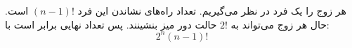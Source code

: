 \p   
هر زوج را یک فرد در نظر می‌گیریم. تعداد راه‌های نشاندن این فرد  
$(n-1)!$ است. حال هر زوج می‌تواند به 
$2!$ حالت دور میز بنشینند. پس تعداد نهایی برابر است با:
$${2^n}(n-1)!$$